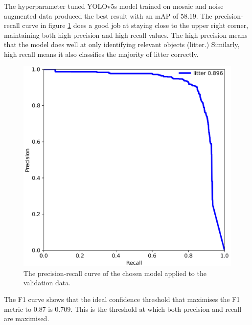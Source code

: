 \documentclass{thesis}
\begin{document}
The hyperparameter tuned YOLOv5s model trained on mosaic and noise augmented data produced the best result with an mAP of 58.19. The precision-recall curve in figure \ref{fig:pr-curve} does a good job at staying close to the upper right corner, maintaining both high precision and high recall values. The high precision means that the model does well at only identifying relevant objects (litter.) Similarly, high recall means it also classifies the majority of litter correctly.

\begin{figure}[h!]
    \centering
    \includegraphics[scale=0.4]{images/pr-curve.png}
    \caption{The precision-recall curve of the chosen model applied to the validation data.}
    \label{fig:pr-curve}
\end{figure}

The F1 curve shows that the ideal confidence threshold that maximises the F1 metric to 0.87 is 0.709. This is the threshold at which both precision and recall are maximised.
\end{document}
